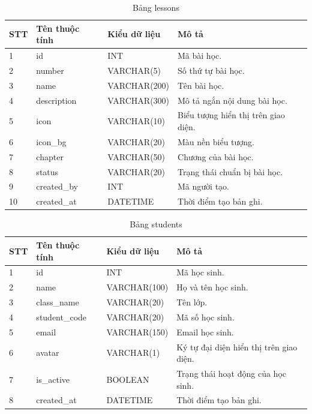 \documentclass[12pt,a4paper]{article}
\begin{document}
	\begin{table}[H]
		\centering
		\caption{Bảng lessons}
		\label{tab:lessons}
		\begin{tabular}{|p{1.5cm}|p{4cm}|p{4cm}|p{5.5cm}|}
			\hline
			\centering\textbf{STT} & \centering\textbf{Tên thuộc tính} & \centering\textbf{Kiểu dữ liệu} & \centering\arraybackslash\textbf{Mô tả} \\
			\hline
			1 & id & INT & Mã bài học. \\
			\hline
			2 & number & VARCHAR(5) & Số thứ tự bài học. \\
			\hline
			3 & name & VARCHAR(200) & Tên bài học. \\
			\hline
			4 & description & VARCHAR(300) & Mô tả ngắn nội dung bài học. \\
			\hline
			5 & icon & VARCHAR(10) & Biểu tượng hiển thị trên giao diện. \\
			\hline
			6 & icon\_bg & VARCHAR(20) & Màu nền biểu tượng. \\
			\hline
			7 & chapter & VARCHAR(50) & Chương của bài học. \\
			\hline
			8 & status & VARCHAR(20) & Trạng thái chuẩn bị bài học. \\
			\hline
			9 & created\_by & INT & Mã người tạo. \\
			\hline
			10 & created\_at & DATETIME & Thời điểm tạo bản ghi. \\
			\hline
		\end{tabular}
	\end{table}
	
	\begin{table}[H]
		\centering
		\caption{Bảng students}
		\label{tab:students}
		\begin{tabular}{|p{1.5cm}|p{4cm}|p{4cm}|p{5.5cm}|}
			\hline
			\centering\textbf{STT} & \centering\textbf{Tên thuộc tính} & \centering\textbf{Kiểu dữ liệu} & \centering\arraybackslash\textbf{Mô tả} \\
			\hline
			1 & id & INT & Mã học sinh. \\
			\hline
			2 & name & VARCHAR(100) & Họ và tên học sinh. \\
			\hline
			3 & class\_name & VARCHAR(20) & Tên lớp. \\
			\hline
			4 & student\_code & VARCHAR(20) & Mã số học sinh. \\
			\hline
			5 & email & VARCHAR(150) & Email học sinh. \\
			\hline
			6 & avatar & VARCHAR(1) & Ký tự đại diện hiển thị trên giao diện. \\
			\hline
			7 & is\_active & BOOLEAN & Trạng thái hoạt động của học sinh. \\
			\hline
			8 & created\_at & DATETIME & Thời điểm tạo bản ghi. \\
			\hline
		\end{tabular}
	\end{table}
	
\end{document}
